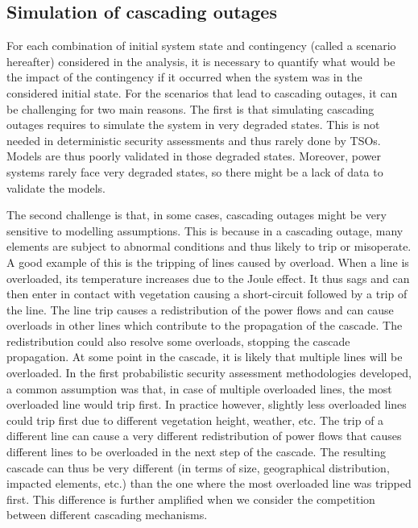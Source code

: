 \subsection{Simulation of cascading outages}
\label{sec:cascading}

For each combination of initial system state and contingency (called a scenario hereafter) considered in the analysis, it is necessary to quantify what would be the impact of the contingency if it occurred when the system was in the considered initial state. For the scenarios that lead to cascading outages, it can be challenging for two main reasons. The first is that simulating cascading outages requires to simulate the system in very degraded states. This is not needed in deterministic security assessments and thus rarely done by TSOs. Models are thus poorly validated in those degraded states. Moreover, power systems rarely face very degraded states, so there might be a lack of data to validate the models.

The second challenge is that, in some cases, cascading outages might be very sensitive to modelling assumptions. This is because in a cascading outage, many elements are subject to abnormal conditions and thus likely to trip or misoperate. A good example of this is the tripping of lines caused by overload. When a line is overloaded, its temperature increases due to the Joule effect. It thus sags and can then enter in contact with vegetation causing a short-circuit followed by a trip of the line. The line trip causes a redistribution of the power flows and can cause overloads in other lines which contribute to the propagation of the cascade. The redistribution could also resolve some overloads, stopping the cascade propagation. At some point in the cascade, it is likely that multiple lines will be overloaded. In the first probabilistic security assessment methodologies developed, a common assumption was that, in case of multiple overloaded lines, the most overloaded line would trip first. In practice however, slightly less overloaded lines could trip first due to different vegetation height, weather, etc. The trip of a different line can cause a very different redistribution of power flows that causes different lines to be overloaded in the next step of the cascade. The resulting cascade can thus be very different (in terms of size, geographical distribution, impacted elements, etc.) than the one where the most overloaded line was tripped first. This difference is further amplified when we consider the competition between different cascading mechanisms.

